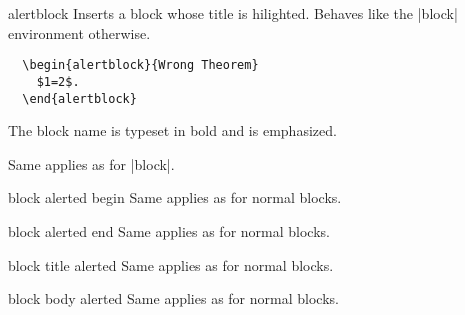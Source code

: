 \begin{environment}{{alertblock}}
  Inserts a block whose title is hilighted. Behaves like the |block|
  environment otherwise.
  \example
\begin{verbatim}
  \begin{alertblock}{Wrong Theorem}
    $1=2$.
  \end{alertblock}
\end{verbatim}

  \articlenote
  The block name is typeset in bold and is emphasized.

  \lyxnote
  Same applies as for |block|.

  \begin{element}{block alerted begin}\yes\no\no
    Same applies as for normal blocks.
  \end{element}

  \begin{element}{block alerted end}\yes\no\no
    Same applies as for normal blocks.
  \end{element}

  \begin{element}{block title alerted}\no\yes\yes
    Same applies as for normal blocks.
  \end{element}

  \begin{element}{block body alerted}\no\yes\yes
    Same applies as for normal blocks.
  \end{element}
\end{environment}

